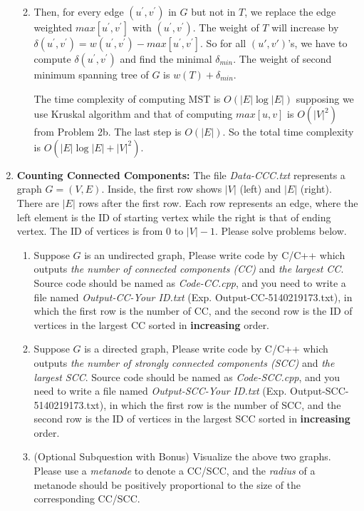 \documentclass[12pt,a4paper]{article}
\makeatletter
\newtheorem*{solution}{Solution}
\theoremstyle{definition}
\renewenvironment{solution}[1][Solution] {\par\pushQED{\qed}\normalfont\topsep6\p@\@plus6\p@\relax\trivlist\item[\hskip\labelsep\bfseries#1\@addpunct{.}]\ignorespaces}{\popQED\endtrivlist\@endpefalse} \makeatother
\makeatother
\begin{document}
\begin{enumerate}
\begin{enumerate}
\begin{solution}
	Then, for every edge $(u^\prime,v^\prime)$ in $G$ but not in $T$, we replace the edge weighted $max[u^\prime,v^\prime]$ with $(u^\prime,v^\prime)$. The weight of $T$ will increase by $\delta(u^\prime,v^\prime)=w(u^\prime,v^\prime)-max[u^\prime,v^\prime]$. So for all $(u',v')$'s, we have to compute $\delta(u^\prime,v^\prime)$ and find the minimal $\delta_{min}$. The weight of second minimum spanning tree of $G$ is $w(T)+\delta_{min}$.
	
	The time complexity of computing MST is $O(|E|\log|E|)$ supposing we use Kruskal algorithm and that of computing $max[u,v]$ is $O(|V|^2)$ from Problem 2b. The last step is $O(|E|)$. So the total time complexity is $O(|E|\log|E|+|V|^2)$.
\end{solution}
\end{enumerate}

\item \textbf{Counting Connected Components:} The file \emph{Data-CCC.txt} represents a graph $G=(V,E)$. Inside, the first row shows $|V|$ (left) and $|E|$ (right). There are $|E|$ rows after the first row. Each row represents an edge, where the left element is the ID of starting vertex while the right is that of ending vertex. The ID of vertices is from $0$ to $|V|-1$. Please solve problems below.
    \begin{enumerate}
    \item Suppose $G$ is an undirected graph, Please write code by C/C++ which outputs \emph{the number of connected components (CC)} and \emph{the largest CC}. Source code should be named as {\color{red}\emph{Code-CC.cpp}}, and you need to write a file named {\color{red}\emph{Output-CC-Your ID.txt}} (Exp. Output-CC-5140219173.txt), in which the first row is the number of CC, and the second row is the ID of vertices in the largest CC sorted in \textbf{increasing} order.
    \item Suppose $G$ is a directed graph, Please write code by C/C++ which outputs \emph{the number of strongly connected components (SCC)} and \emph{the largest SCC}. Source code should be named as {\color{red}\emph{Code-SCC.cpp}}, and you need to write a file named {\color{red}\emph{Output-SCC-Your ID.txt}} (Exp. Output-SCC-5140219173.txt), in which the first row is the number of SCC, and the second row is the ID of vertices in the largest SCC sorted in \textbf{increasing} order.
    \item {\color{red}(Optional Subquestion with Bonus)} Visualize the above two graphs. Please use a \emph{metanode} to denote a CC/SCC, and the \emph{radius} of a metanode should be positively proportional to the size of the corresponding CC/SCC.
    

\end{enumerate}
\end{enumerate}
\end{document}
